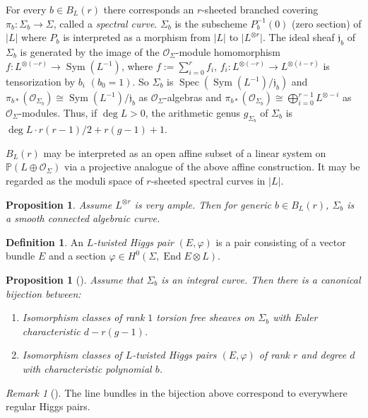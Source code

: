 \documentclass[12pt,a4paper,oneside,english]{smfart}
\newtheorem{prop}[thm]{Proposition}
\theoremstyle{definition}
\newtheorem{defn}[thm]{Definition}
\theoremstyle{remark}
\newtheorem{rem}[thm]{Remark}
\DeclareMathOperator{\End}{End}
\DeclareMathOperator{\Spec}{Spec}
\DeclareMathOperator{\Sym}{Sym}
\newcommand{\cO}{\mathcal{O}}
\newcommand{\tot}[1]{\lvert #1 \rvert}
\begin{document}
For every $b \in B_L(r)$ there corresponds an $r$-sheeted branched covering $\pi_b \colon \Sigma_b \to \Sigma$, called a \emph{spectral curve}. $\Sigma_b$ is the subscheme $P_b^{-1}(0)$ (zero section) of $\tot{L}$ where $P_b$ is interpreted as a morphism from $\tot{L}$ to $\tot{L^{\otimes r}}$. The ideal sheaf $\mathfrak{j}_b$ of $\Sigma_b$ is generated by the image of the $\cO_\Sigma$-module homomorphism $f \colon L^{\otimes(-r)} \to \Sym(L^{-1})$, where $f := \sum_{i=0}^{r} f_i$, $f_i \colon L^{\otimes(-r)} \to L^{\otimes(i-r)}$ is tensorization by $b_i$ $(b_0 = 1)$. So $\Sigma_b$ is $\Spec(\Sym(L^{-1})/\mathfrak{j}_b)$ and $\pi_{b*}(\cO_{\Sigma_b}) \cong \Sym(L^{-1})/\mathfrak{j}_b$ as $\cO_\Sigma$-algebras and $\pi_{b*}(\cO_{\Sigma_b}) \cong \bigoplus_{i=0}^{r-1} L^{\otimes -i}$ as $\cO_\Sigma$-modules. Thus, if $\deg L > 0$, the arithmetic genus $g_{\Sigma_b}$ of $\Sigma_b$ is $\deg L \cdot r(r-1)/2 + r(g-1) + 1$.

$B_L(r)$ may be interpreted as an open affine subset of a linear system on $\mathbb{P}(L \oplus \cO_\Sigma)$ via a projective analogue of the above affine construction. It may be regarded as the moduli space of $r$-sheeted spectral curves in $\tot{L}$.

\begin{prop}\label{t2.1}
Assume $L^{\otimes r}$ is very ample. Then for generic $b \in B_L(r)$, $\Sigma_b$ is a smooth connected algebraic curve.
\end{prop}

\begin{defn}\label{t2.2}
An \emph{$L$-twisted Higgs pair} $(E, \varphi)$ is a pair consisting of a vector bundle $E$ and a section $\varphi \in H^0(\Sigma, \End E \otimes L)$.
\end{defn}

\begin{prop}[\cite{B-N-R}]\label{t2.3}
Assume that $\Sigma_b$ is an integral curve. Then there is a canonical bijection between:
\begin{enumerate}
    \item Isomorphism classes of rank $1$ torsion free sheaves on $\Sigma_b$ with Euler characteristic $d - r(g-1)$.
    \item Isomorphism classes of $L$-twisted Higgs pairs $(E, \varphi)$ of rank $r$ and degree $d$ with characteristic polynomial $b$.
\end{enumerate}
\end{prop}

\begin{rem}[\cite{B}]\label{t2.4}
The line bundles in the bijection above correspond to everywhere regular Higgs pairs.
\end{rem}
\end{document}
